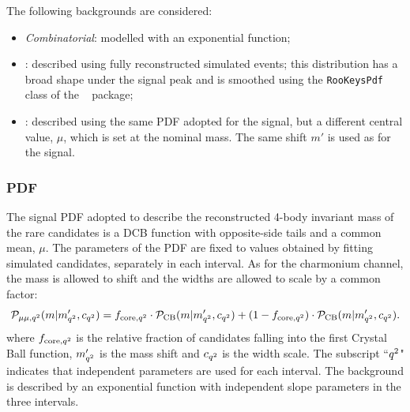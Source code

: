 The following backgrounds are considered:

\begin{itemize}

\item \textit{Combinatorial}: modelled with an exponential function;

\item \LbTopKJPsmm: described using fully reconstructed simulated events;
this distribution has a broad shape under the signal peak and is smoothed 
using the \verb!RooKeysPdf! class of the \roofit~\cite{Verkerke:2003ir} package;

\item \BsToKstJPsmm: described using the same PDF adopted for the signal, but a different central 
value, $\mu$, which is set at the \Bs nominal mass. The same shift $m'$  is used as for the signal.

\end{itemize}


\subsubsection{\BdToKstmm PDF}

The signal PDF adopted to describe the reconstructed 4-body invariant mass of the rare \BdToKstmm candidates 
is a DCB function with opposite-side tails and a common mean, $\mu$.
The parameters of the PDF are fixed to values obtained by fitting simulated candidates, separately in each \qsq interval.
As for the charmonium channel, the mass is allowed to shift and the widths are allowed to scale by a common factor:
%
$$\mathcal{P}_{{\rm \mu\mu}, {q^2}}(m | m'_{{q^2}}, c_{{q^2}}) = 
f_{{\rm core}, {q^2}} \cdot \mathcal{P}_{\rm CB}(m | m'_{{q^2}}, c_{{q^2}}) + 
(1 - f_{{\rm core}, {q^2}}) \cdot \mathcal{P}_{\rm CB}(m | m'_{{q^2}}, c_{{q^2}}).$$
%
where $f_{{\rm core}, {q^2}}$ is the relative fraction of candidates falling into the first Crystal Ball function, 
$m'_{{q^2}}$ is the mass shift and $c_{{q^2}}$ is the width scale.
The subscript ``${q^2}$" indicates that independent parameters are used for each \qsq interval.
The background is described by an exponential function with independent slope parameters in the three \qsq intervals.

